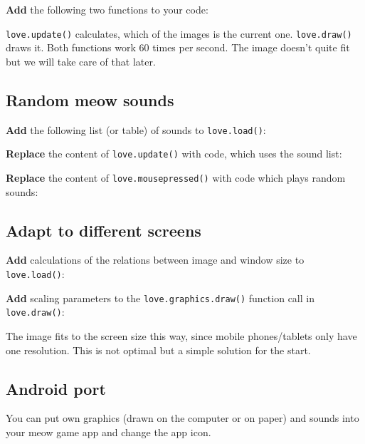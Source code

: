 \documentclass[a4paper, 11pt]{article}
\begin{document}


\textbf{Add} the following two functions to your code:



\texttt{love.update()} calculates, which of the images is the current one. \texttt{love.draw()} draws it. Both functions work 60 times per second. The image doesn't quite fit but we will take care of that later.

\subsection{Random meow sounds}

\textbf{Add} the following list (or table) of sounds to \texttt{love.load()}:



\textbf{Replace} the content of \texttt{love.update()} with code, which uses the sound list:



\textbf{Replace} the content of \texttt{love.mousepressed()} with code which plays random sounds:



\subsection{Adapt to different screens}

\textbf{Add} calculations of the relations between image and window size to \texttt{love.load()}:



\textbf{Add} scaling parameters to the \texttt{love.graphics.draw()} function call in \texttt{love.draw()}:



The image fits to the screen size this way, since mobile phones/tablets only have one resolution. This is not optimal but a simple solution for the start.

\subsection{Android port} \label{androidport}

You can put own graphics (drawn on the computer or on paper) and sounds into your meow game app and change the app icon.
\end{document}
